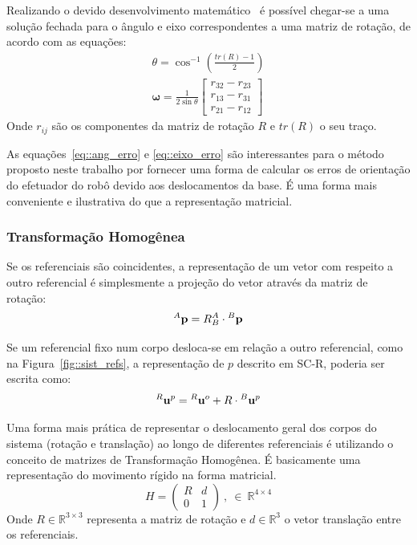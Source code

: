 Realizando o devido desenvolvimento matemático~\cite{murray1994mathematical} é
possível chegar-se a uma solução fechada para o ângulo e eixo correspondentes a
uma matriz de rotação, de acordo com as equações:
%
\begin{gather}
	\theta =  \cos^{-1}\left(\frac{tr(R) - 1}{2}\right) \label{eq::ang_erro} \\
	\boldsymbol{\omega} = \frac{1}{2 \sin{\theta}} \begin{bmatrix}
r_{32}-r_{23}\\ 
r_{13}-r_{31}\\ 
r_{21}-r_{12}
\end{bmatrix} \label{eq::eixo_erro}
\end{gather}
%
Onde $r_{ij}$ são os componentes da matriz de rotação $R$ e $tr(R)$ o seu
traço.

As equações~\ref{eq::ang_erro} e \ref{eq::eixo_erro} são interessantes para o
método proposto neste trabalho por fornecer uma forma de calcular os erros de
orientação do efetuador do robô devido aos deslocamentos da base. É uma forma
mais conveniente e ilustrativa do que a representação matricial.



\subsubsection{Transformação Homogênea}

Se os referenciais são coincidentes, a representação de um vetor com respeito a
outro referencial é simplesmente a projeção do vetor através da matriz de
rotação:
%
\begin{equation}
^{A}\textrm{\textbf{p}} = R_{B}^{A} \cdot {}^{B}\textrm{\textbf{p}}
\end{equation}
%

Se um referencial fixo num corpo desloca-se em relação a outro referencial, como
na Figura~\ref{fig::sist_refs}, a representação de $p$ descrito em SC-R, poderia
ser escrita como:
%
\begin{equation} \label{eq::upemr}
	^{R}\textrm{\textbf{u}}^{p} = {}^{R}\textrm{\textbf{u}}^{o} + R \cdot
	{}^{B}\textrm{\textbf{u}}^{p}
\end{equation}
%

Uma forma mais prática de representar o deslocamento geral dos corpos do sistema
(rotação e translação) ao longo de diferentes referenciais é utilizando o
conceito de matrizes de Transformação Homogênea. É basicamente uma representação
do movimento rígido na forma matricial. 
\begin{equation}
	H = 
\begin{pmatrix}
R & d\\ 
0 & 1
\end{pmatrix} ~,~ \in ~ \mathbb{R}^{4\times4}
\end{equation}
%
Onde $R \in \mathbb{R}^{3\times3}$ representa a matriz de rotação e $d \in
\mathbb{R}^{3}$ o vetor translação entre os referenciais.

